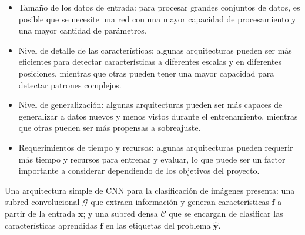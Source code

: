 \begin{itemize}
    \item Tamaño de los datos de entrada: para procesar grandes conjuntos de datos, es posible que se necesite una red con una
          mayor capacidad de procesamiento y una mayor cantidad de parámetros.
    \item Nivel de detalle de las características: algunas arquitecturas pueden ser más eficientes para detectar características
          a diferentes escalas y en diferentes posiciones, mientras que otras pueden tener una mayor capacidad para detectar
          patrones complejos.
    \item Nivel de generalización: algunas arquitecturas pueden ser más capaces de generalizar a datos nuevos y menos vistos
          durante el entrenamiento, mientras que otras pueden ser más propensas a sobreajuste.
    \item Requerimientos de tiempo y recursos: algunas arquitecturas pueden requerir más tiempo y recursos para entrenar y
          evaluar, lo que puede ser un factor importante a considerar dependiendo de los objetivos del proyecto.
\end{itemize}

Una arquitectura simple de CNN para la clasificación de imágenes presenta: una subred convolucional $\mathcal{G}$ que
extraen información y generan características $\mathbf{f}$ a partir de la entrada $\mathbf{x}$; y una subred densa
$\mathcal{C}$ que se encargan de clasificar las características aprendidas $\mathbf{f}$ en las etiquetas del problema
$\mathbf{\hat{y}}$.


